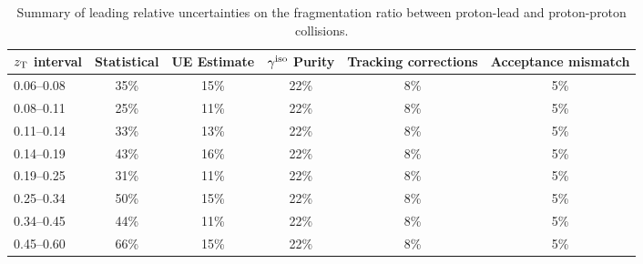 \begin{table}[h]
\centering
\caption{Summary of leading relative uncertainties on the fragmentation ratio between proton-lead and proton-proton collisions.}
   \begin{tabular*}{1.0\columnwidth}{@{\extracolsep{\fill}}lccccc@{}}
    \hline
$z_{\mathrm{T}}$ interval  & Statistical  & UE Estimate  & $\gamma^\mathrm{iso}$ Purity   & Tracking corrections & Acceptance mismatch \\
\hline
0.06--0.08 & 35\% & 15\% & 22\% & 8\% & 5\%\\
0.08--0.11 & 25\% & 11\% & 22\% & 8\% & 5\%\\
0.11--0.14 & 33\% & 13\% & 22\% & 8\% & 5\%\\
0.14--0.19 & 43\% & 16\% & 22\% & 8\% & 5\%\\
0.19--0.25 & 31\% & 11\% & 22\% & 8\% & 5\%\\
0.25--0.34 & 50\% & 15\% & 22\% & 8\% & 5\%\\
0.34--0.45 & 44\% & 11\% & 22\% & 8\% & 5\%\\
0.45--0.60 & 66\% & 15\% & 22\% & 8\% & 5\%\\
       \hline 
   \end{tabular*}
   \label{tab:pPb_FF_Uncertainties}
\end{table}






